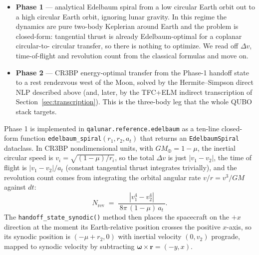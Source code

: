 \documentclass[8pt,a4paper]{article}
\newcommand{\bvec}[1]{\bm{#1}}
\theoremstyle{definition}
\theoremstyle{remark}
\begin{document}
\begin{itemize}[leftmargin=1.5em, itemsep=1pt]
  \item \textbf{Phase 1} --- analytical Edelbaum spiral from a low
    circular Earth orbit out to a high circular Earth orbit, ignoring
    lunar gravity. In this regime the dynamics are pure two-body
    Keplerian around Earth and the problem is closed-form: tangential
    thrust is already Edelbaum-optimal for a coplanar circular-to-
    circular transfer, so there is nothing to optimize. We read off
    $\Delta v$, time-of-flight and revolution count from the
    classical formulas and move on.
  \item \textbf{Phase 2} --- CR3BP energy-optimal transfer from the
    Phase-1 handoff state to a rest rendezvous west of the Moon,
    solved by the Hermite--Simpson direct NLP described above (and,
    later, by the TFC+ELM indirect transcription of
    Section~\ref{sec:transcription}). This is the three-body leg
    that the whole QUBO stack targets.
\end{itemize}

Phase 1 is implemented in \texttt{qalunar.reference.edelbaum} as a
ten-line closed-form function
\texttt{edelbaum\_spiral}$(r_1, r_2, a_t)$ that returns an
\texttt{EdelbaumSpiral} dataclass. In CR3BP nondimensional units,
with $GM_{\oplus} = 1 - \mu$, the inertial circular speed is
$v_i = \sqrt{(1-\mu)/r_i}$, so the total $\Delta v$ is just
$|v_1 - v_2|$, the time of flight is $|v_1 - v_2| / a_t$ (constant
tangential thrust integrates trivially), and the revolution count
comes from integrating the orbital angular rate $v/r = v^3/GM$
against $dt$:
\begin{equation}
  N_{\mathrm{rev}}
  \;=\;
  \frac{|v_1^4 - v_2^4|}{\,8\pi\,(1-\mu)\,a_t\,}.
\end{equation}
The \texttt{handoff\_state\_synodic()} method then places the
spacecraft on the $+x$ direction at the moment its Earth-relative
position crosses the positive $x$-axis, so its synodic position is
$(-\mu + r_2, 0)$ with inertial velocity $(0, v_2)$ prograde, mapped
to synodic velocity by subtracting
$\bm\omega \times \bvec r = (-y, x)$.
\end{document}
